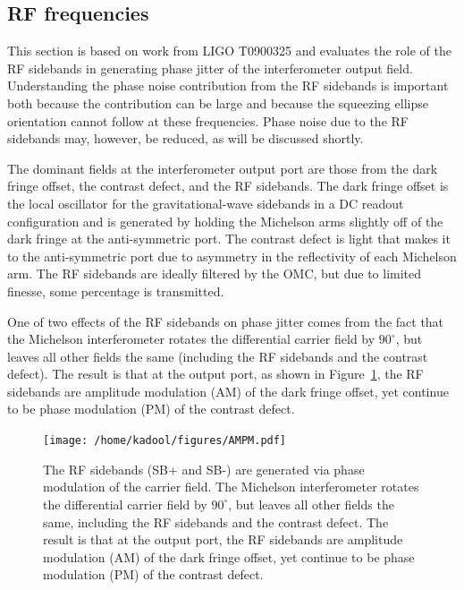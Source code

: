 \documentclass{ligodoc}
\begin{document}
\subsection{RF frequencies}
This section is based on work from LIGO T0900325 and evaluates the
role of the RF sidebands in generating phase jitter of the
interferometer output field. Understanding the phase noise
contribution from the RF sidebands is important both because the
contribution can be large and because the squeezing ellipse
orientation cannot follow at these frequencies. Phase noise due to the
RF sidebands may, however, be reduced, as will be discussed shortly.

The dominant fields at the interferometer output port are those from
the dark fringe offset, the contrast defect, and the RF sidebands. The
dark fringe offset is the local oscillator for the gravitational-wave
sidebands in a DC readout configuration and is generated by holding
the Michelson arms slightly off of the dark fringe at the
anti-symmetric port. The contrast defect is light that makes it to the
anti-symmetric port due to asymmetry in the reflectivity of each
Michelson arm. The RF sidebands are ideally filtered by the OMC, but
due to limited finesse, some percentage is transmitted.

One of two effects of the RF sidebands on phase jitter comes from the
fact that the Michelson interferometer rotates the differential
carrier field by $90^\circ$, but leaves all other fields the same
(including the RF sidebands and the contrast defect). The result is
that at the output port, as shown in Figure~\ref{fig:AMPM}, the RF
sidebands are amplitude modulation (AM) of the dark fringe offset, yet
continue to be phase modulation (PM) of the contrast defect.

\begin{figure}
\begin{centering}
\texttt{[image: /home/kadool/figures/AMPM.pdf]}
\caption{The RF sidebands (SB+ and SB-) are generated via phase
  modulation of the carrier field. The Michelson interferometer
  rotates the differential carrier field by $90^\circ$, but leaves all
  other fields the same, including the RF sidebands and the contrast
  defect. The result is that at the output port, the RF sidebands are
  amplitude modulation (AM) of the dark fringe offset, yet continue to
  be phase modulation (PM) of the contrast defect.}
\label{fig:AMPM}
\end{centering}
\end{figure}
\end{document}
